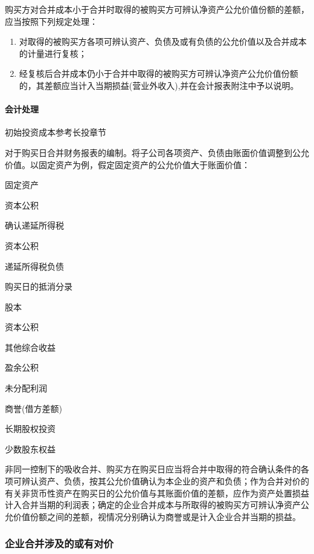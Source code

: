 \documentclass[UTF8,12pt]{ctexart}
\newenvironment{Dr}{%
	\begin{list}{}%
		{
			\setlength{\leftmargin}{2em}
			\setlength{\labelwidth}{2em}
			\setlength{\labelsep}{0pt}
			\setlength{\itemindent}{0pt}
			\setlength{\listparindent}{0pt}
			\setlength{\parsep}{0pt}
			\setlength{\topsep}{0pt}
		}
		\item[\textbf{借：}]
	}{%
	\end{list}
}
\newenvironment{Cr}{%
	\begin{list}{}%
		{
			\setlength{\leftmargin}{3em}
			\setlength{\labelwidth}{2em}
			\setlength{\labelsep}{0pt}
			\setlength{\itemindent}{0pt}
			\setlength{\listparindent}{0pt}
			\setlength{\parsep}{0pt}
			\setlength{\topsep}{0pt}
		}
		\item[\textbf{贷：}]
	}{%
	\end{list}
}
\numberwithin{equation}{section} %
\numberwithin{figure}{section}
\numberwithin{table}{section}
\begin{document}
	购买方对合并成本小于合并时取得的被购买方可辨认净资产公允价值份额的差额，应当按照下列规定处理：
	\begin{enumerate}
		\item 对取得的被购买方各项可辨认资产、负债及或有负债的公允价值以及合并成本的计量进行复核；
		
		\item 经复核后合并成本仍小于合并中取得的被购买方可辨认净资产公允价值份额的，其差额应当计入当期损益(营业外收入),并在会计报表附注中予以说明。
	\end{enumerate}
	
	\paragraph{会计处理}
	初始投资成本参考长投章节
	
	对于购买日合并财务报表的编制。将子公司各项资产、负债由账面价值调整到公允价值。以固定资产为例，假定固定资产的公允价值大于账面价值：
	\begin{Dr}
		固定资产
	\end{Dr}
	\begin{Cr}
		资本公积
	\end{Cr}
	
	确认递延所得税
	\begin{Dr}
		资本公积
	\end{Dr}
	\begin{Cr}
		递延所得税负债
	\end{Cr}
	
	购买日的抵消分录
	\begin{Dr}
		股本
		
		资本公积
		
		其他综合收益
		
		盈余公积
		
		未分配利润
		
		商誉(借方差额)
	\end{Dr}
	\begin{Cr}
		长期股权投资
		
		少数股东权益
	\end{Cr}

	非同一控制下的吸收合并、购买方在购买日应当将合并中取得的符合确认条件的各项可辨认资产、负债，按其公允价值确认为本企业的资产和负债；作为合并对价的有关非货币性资产在购买日的公允价值与其账面价值的差额，应作为资产处置损益计入合并当期的利润表；确定的企业合并成本与所取得的被购买方可辨认净资产公允价值份额之间的差额，视情况分别确认为商誉或是计入企业合并当期的损益。
	
	\subsubsection{企业合并涉及的或有对价}
\end{document}

